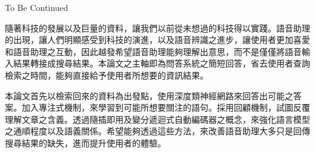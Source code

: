 \NTUtitlepage  %

\newpage
\setcounter{page}{1}

\NTUoralpage  %

\mydoublespacing
\begin{acknowledgement} %
    To Be Continued
\end{acknowledgement}

\begin{zhAbstract}  %
    隨著科技的發展以及巨量的資料，讓我們以前從未想過的科技得以實踐。語音助理的出現，讓人們明顯感受到科技的演進，以及語音辨識之進步，讓使用者更加喜愛和語音助理之互動，因此越發希望語音助理能夠理解出意思，而不是僅僅將語音輸入結果轉接成搜尋結果。本論文之主軸即為問答系統之簡短回答，省去使用者查詢檢索之時間，能夠直接給予使用者所想要的資訊結果。

    本論文首先以檢索回來的資料為出發點，使用深度類神經網路來回答出可能之答案。加入專注式機制，來學習到可能所想要關注的語句。採用回顧機制，試圖反覆理解文章之含義。透過隨插即用及變分遞迴式自動編碼器之概念，來強化語言模型之通順程度以及語義關係。希望能夠透過這些方法，來改善語音助理大多只是回傳搜尋結果的缺失，進而提升使用者的體驗。
\end{zhAbstract}

{
\mysinglespacing\selectfont
\tableofcontents %

\listoffigures  %

\listoftables  %
\par
}

\newpage
\setcounter{page}{1}
